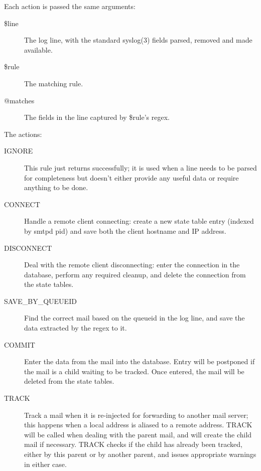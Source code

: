 \documentclass[a4paper,12pt,draft]{article}
\begin{document}
Each action is passed the same arguments: 

\begin{description}

    \item [\$line] The log line, with the standard syslog(3) fields parsed,
        removed and made available.
        
    \item [\$rule] The matching rule.
        
    \item [@matches] The fields in the line captured by \$rule's regex.

\end{description}

The actions:

\begin{description}

    \item [IGNORE] This rule just returns successfully; it is used when a
        line needs to be parsed for completeness but doesn't either provide
        any useful data or require anything to be done.

    \item [CONNECT] Handle a remote client connecting: create a new state
        table entry (indexed by smtpd pid) and save both the client
        hostname and IP address.

    \item [DISCONNECT] Deal with the remote client disconnecting: enter the
        connection in the database, perform any required cleanup, and
        delete the connection from the state tables.

    \item [SAVE\_BY\_QUEUEID] Find the correct mail based on the queueid in
        the log line, and save the data extracted by the regex to it.

    \item [COMMIT] Enter the data from the mail into the database. Entry
        will be postponed if the mail is a child waiting to be tracked.
        Once entered, the mail will be deleted from the state tables.

    \item [TRACK] Track a mail when it is re-injected for forwarding to
        another mail server; this happens when a local address is aliased
        to a remote address.  TRACK will be called when dealing with the
        parent mail, and will create the child mail if necessary. TRACK
        checks if the child has already been tracked, either by this parent
        or by another parent, and issues appropriate warnings in either
        case.


\end{description}
\end{document}
